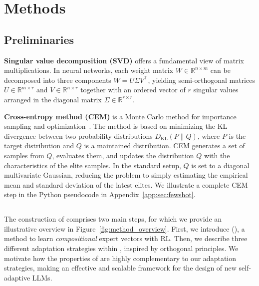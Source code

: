\section{Methods}
\label{sec:methods}

\vspace{-2mm}
\subsection{Preliminaries}

\textbf{Singular value decomposition (SVD)} offers a fundamental view of matrix multiplications.
In neural networks, each weight matrix $W \in \mathbb{R}^{n \times m}$ can be decomposed into three components $W = U \Sigma V^\intercal$, yielding semi-orthogonal matrices $U \in \mathbb{R}^{m \times r}$ and $V \in \mathbb{R}^{n \times r}$ together with an ordered vector of $r$ singular values arranged in the diagonal matrix $\Sigma \in \mathbb{R}^{r \times r}$.

\textbf{Cross-entropy method (CEM)} is a Monte Carlo method for importance sampling and optimization~\citep{rubinstein2004cross}.
The method is based on minimizing the KL divergence between two probability distributions $D_\mathrm{KL}(P\|Q)$, where $P$ is the target distribution and $Q$ is a maintained distribution. 
CEM generates a set of samples from $Q$, evaluates them, and updates the distribution $Q$ with the characteristics of the elite samples. In the standard setup, $Q$ is set to a diagonal multivariate Gaussian, reducing the problem to simply estimating the empirical mean and standard deviation of the latest elites. We illustrate a complete CEM step in the Python pseudocode in Appendix~\ref{app:sec:fewshot}.

\vspace{-2mm}
\subsection{\textsc{\implname}}
\label{sec:transformer^2}

The construction of \implname comprises two main steps, for which we provide an illustrative overview in Figure~\ref{fig:method_overview}.
First, we introduce \svdname (\svdacro), a method to learn \textit{compositional} expert vectors with RL.
Then, we describe three different adaptation strategies within \implname, inspired by orthogonal principles.
We motivate how the properties of \svdacro are highly complementary to our adaptation strategies, making \implname an effective and scalable framework for the design of new self-adaptive LLMs.

